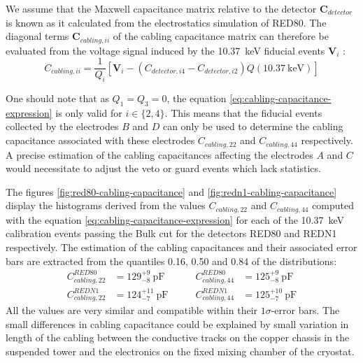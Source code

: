 We assume that the Maxwell capacitance matrix relative to the detector $\bm{C}_{detector}$ is known as it calculated from the electrostatics simulation of RED80. The diagonal terms $\bm{C}_{cabling, ii}$ of the cabling capacitance matrix can therefore be evaluated from the voltage signal induced by the \SI{10.37}{\kilo\eV} fiducial events $\bm{V}_{i}$ :
\begin{equation}
\label{eq:cabling-capacitance-expression}
C_{cabling, ii}
=
\frac{1}{Q_i} \left[ \bm{V}_{i} - \left( C_{detector, i4} - C_{detector, i2} \right) Q(\SI{10.37}{\kilo\eV}) \right]
\end{equation}

One should note that as $Q_1 = Q_3 = 0$, the equation \ref{eq:cabling-capacitance-expression} is only valid for $i \in \{ 2,4 \}$. This means that the fiducial events collected by the electrodes $B$ and $D$ can only be used to determine the cabling capacitance associated with these electrodes $C_{cabling, 22}$ and $C_{cabling, 44}$ respectively. A precise estimation of the cabling capacitances affecting the electrodes $A$ and $C$ would necessitate to adjust the veto or guard events which lack statistics.

The figures \ref{fig:red80-cabling-capacitance} and \ref{fig:redn1-cabling-capacitance} display the histograms derived from the values $C_{cabling, 22}$ and $C_{cabling, 44}$ computed with the equation \ref{eq:cabling-capacitance-expression} for each of the \SI{10.37}{\kilo\eV} calibration events passing the Bulk cut for the detectors RED80 and REDN1 respectively. The estimation of the cabling capacitances and their associated error bars are extracted from the quantiles 0.16, 0.50 and 0.84 of the distributions:
\begin{align}
C_{cabling, 22}^{RED80} &= 129_{-8}^{+9} \ \si{\pico\farad}
\quad \quad 
& C_{cabling, 44}^{RED80} &= 125_{-8}^{+9} \ \si{\pico\farad}
\\
C_{cabling, 22}^{REDN1} &= 124_{-7}^{+11} \ \si{\pico\farad}
\quad \quad 
& C_{cabling, 44}^{REDN1} &= 125_{-7}^{+10} \ \si{\pico\farad}
\end{align}
All the values are very similar and compatible within their $1\sigma$-error bars. The small differences in cabling capacitance could be explained by small variation in length of the cabling between the conductive tracks on the copper chassis in the suspended tower and the electronics on the fixed mixing chamber of the cryostat.

